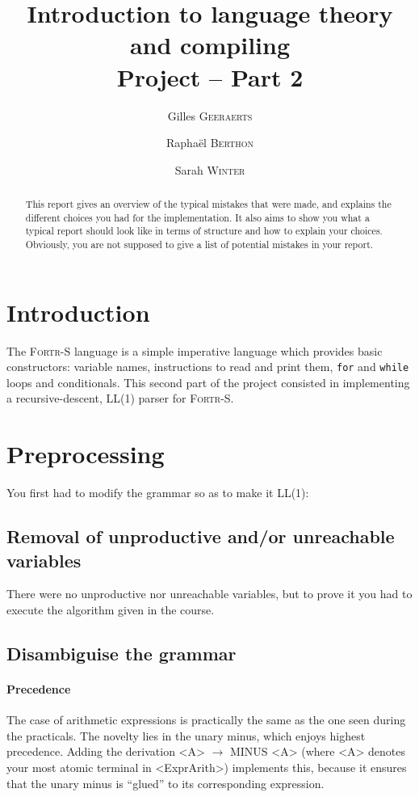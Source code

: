 \documentclass[a4paper]{scrartcl}
\title{Introduction to language theory and compiling\\
  Project -- Part 2}
\author{Gilles \textsc{Geeraerts}\and Rapha\"el \textsc{Berthon} \and
  Sarah \textsc{Winter}}
\newcommand{\mylanguage}{{\scshape Fortr}-S\xspace}
\begin{document}
\maketitle


\begin{abstract}
This report gives an overview of the typical mistakes that were made, and explains the different choices you had for the implementation. It also aims to show you what a typical report should look like in terms of structure and how to explain your choices. Obviously, you are not supposed to give a list of potential mistakes in your report.
\end{abstract}

\section{Introduction}

The \mylanguage language is a simple imperative language which provides basic constructors: variable names, instructions to read and print them, \texttt{for} and \texttt{while} loops and conditionals. This second part of the project consisted in implementing a recursive-descent, LL(1) parser for \mylanguage.

\section{Preprocessing}

You first had to modify the grammar so as to make it LL(1):

\subsection{Removal of unproductive and/or unreachable variables}

There were no unproductive nor unreachable variables, but to prove it you had to execute the algorithm given in the course.

\subsection{Disambiguise the grammar}

\paragraph{Precedence}
The case of arithmetic expressions is practically the same as the one seen during the practicals. The novelty lies in the unary minus, which enjoys highest precedence. Adding the derivation <A> $\rightarrow$ MINUS <A> (where <A> denotes your most atomic terminal in <ExprArith>) implements this, because it ensures that the unary minus is ``glued'' to its corresponding expression.
\end{document}
